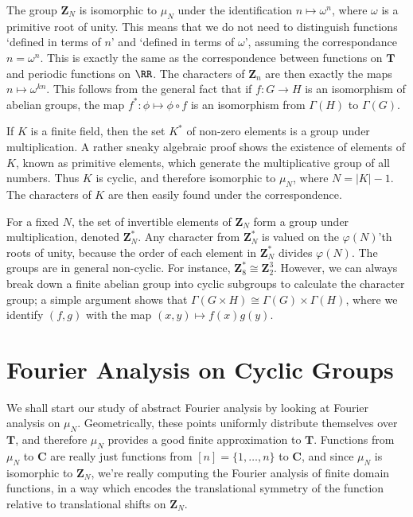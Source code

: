 \begin{example}
    The group $\mathbf{Z}_N$ is isomorphic to $\mu_N$ under the identification $n \mapsto \omega^n$, where $\omega$ is a primitive root of unity. This means that we do not need to distinguish functions `defined in terms of $n$' and `defined in terms of $\omega$', assuming the correspondance $n = \omega^n$. This is exactly the same as the correspondence between functions on $\mathbf{T}$ and periodic functions on $\RR$. The characters of $\mathbf{Z}_n$ are then exactly the maps $n \mapsto \omega^{kn}$. This follows from the general fact that if $f: G \to H$ is an isomorphism of abelian groups, the map $f^*: \phi \mapsto \phi \circ f$ is an isomorphism from $\Gamma(H)$ to $\Gamma(G)$.
\end{example}

\begin{example}
    If $K$ is a finite field, then the set $K^*$ of non-zero elements is a group under multiplication. A rather sneaky algebraic proof shows the existence of elements of $K$, known as primitive elements, which generate the multiplicative group of all numbers. Thus $K$ is cyclic, and therefore isomorphic to $\mu_N$, where $N = |K| - 1$. The characters of $K$ are then easily found under the correspondence.
\end{example}

\begin{example}
    For a fixed $N$, the set of invertible elements of $\mathbf{Z}_N$ form a group under multiplication, denoted $\mathbf{Z}_N^*$. Any character from $\mathbf{Z}_N^*$ is valued on the $\varphi(N)$'th roots of unity, because the order of each element in $\mathbf{Z}_N^*$ divides $\varphi(N)$. The groups are in general non-cyclic. For instance, $\mathbf{Z}_8^* \cong \mathbf{Z}_2^3$. However, we can always break down a finite abelian group into cyclic subgroups to calculate the character group; a simple argument shows that $\Gamma(G \times H) \cong \Gamma(G) \times \Gamma(H)$, where we identify $(f,g)$ with the map $(x,y) \mapsto f(x)g(y)$.
\end{example}

\section{Fourier Analysis on Cyclic Groups}

We shall start our study of abstract Fourier analysis by looking at Fourier analysis on $\mu_N$. Geometrically, these points uniformly distribute themselves over $\mathbf{T}$, and therefore $\mu_N$ provides a good finite approximation to $\mathbf{T}$. Functions from $\mu_N$ to $\mathbf{C}$ are really just functions from $[n] = \{ 1, \dots, n \}$ to $\mathbf{C}$, and since $\mu_N$ is isomorphic to $\mathbf{Z}_N$, we're really computing the Fourier analysis of finite domain functions, in a way which encodes the translational symmetry of the function relative to translational shifts on $\mathbf{Z}_N$.

